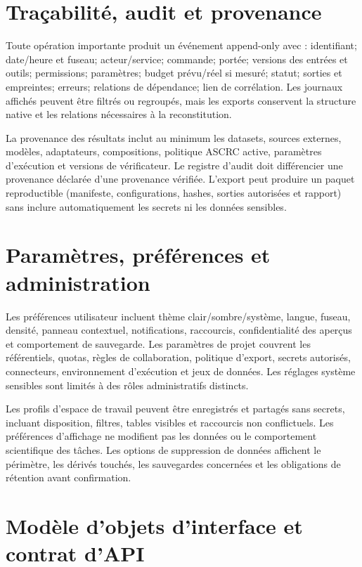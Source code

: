 \documentclass[11pt,a4paper]{article}
\begin{document}
\section{Traçabilité, audit et provenance}
Toute opération importante produit un événement append-only avec : identifiant; date/heure et fuseau; acteur/service; commande; portée; versions des entrées et outils; permissions; paramètres; budget prévu/réel si mesuré; statut; sorties et empreintes; erreurs; relations de dépendance; lien de corrélation. Les journaux affichés peuvent être filtrés ou regroupés, mais les exports conservent la structure native et les relations nécessaires à la reconstitution.

La provenance des résultats inclut au minimum les datasets, sources externes, modèles, adaptateurs, compositions, politique ASCRC active, paramètres d'exécution et versions de vérificateur. Le registre d'audit doit différencier une provenance déclarée d'une provenance vérifiée. L'export peut produire un paquet reproductible (manifeste, configurations, hashes, sorties autorisées et rapport) sans inclure automatiquement les secrets ni les données sensibles.

\section{Paramètres, préférences et administration}
Les préférences utilisateur incluent thème clair/sombre/système, langue, fuseau, densité, panneau contextuel, notifications, raccourcis, confidentialité des aperçus et comportement de sauvegarde. Les paramètres de projet couvrent les référentiels, quotas, règles de collaboration, politique d'export, secrets autorisés, connecteurs, environnement d'exécution et jeux de données. Les réglages système sensibles sont limités à des rôles administratifs distincts.

Les profils d'espace de travail peuvent être enregistrés et partagés sans secrets, incluant disposition, filtres, tables visibles et raccourcis non conflictuels. Les préférences d'affichage ne modifient pas les données ou le comportement scientifique des tâches. Les options de suppression de données affichent le périmètre, les dérivés touchés, les sauvegardes concernées et les obligations de rétention avant confirmation.

\section{Modèle d'objets d'interface et contrat d'API}
\end{document}
